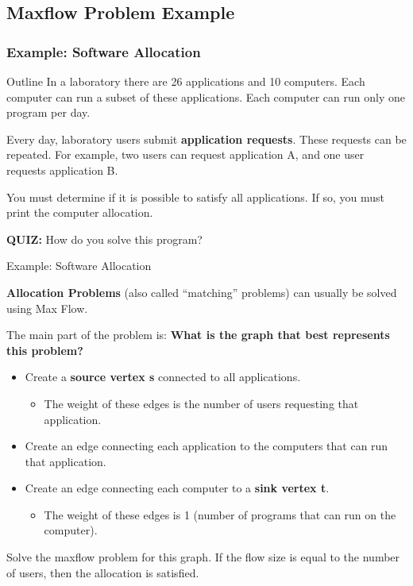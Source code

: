 \subsection{Maxflow Problem Example}
\begin{frame}
  \frametitle{Example: Software Allocation}
    \begin{block}{Outline}
      In a laboratory there are 26 applications and 10 computers. Each computer can run a subset of these applications. Each computer can run only one program per day.\bigskip

      Every day, laboratory users submit {\bf application requests}. These requests can be repeated. For example, two users can request application A, and one user requests application B.

      You must determine if it is possible to satisfy all applications. If so, you must print the computer allocation.
    \end{block}

    \bigskip
    {\bf QUIZ:} How do you solve this program?
\end{frame}

\begin{frame}{Example: Software Allocation}

    {\bf Allocation Problems} (also called ``matching''
    problems) can usually be solved using Max Flow.
    \bigskip

    The main part of the problem is: {\bf What is the graph that best represents this problem?}

    \begin{itemize}
      \item Create a {\bf source vertex s} connected to all applications.
      \begin{itemize}
        \item The weight of these edges is the number of users requesting that application.
      \end{itemize}\medskip
      \item Create an edge connecting each application to the computers that can run that application.\medskip
      \item Create an edge connecting each computer to a {\bf sink vertex t}.
      \begin{itemize}
        \item The weight of these edges is 1 (number of programs that can run on the computer).
      \end{itemize}
    \end{itemize}\bigskip

    Solve the maxflow problem for this graph. If the flow size is equal to the number of users, then the allocation is satisfied.
\end{frame}

